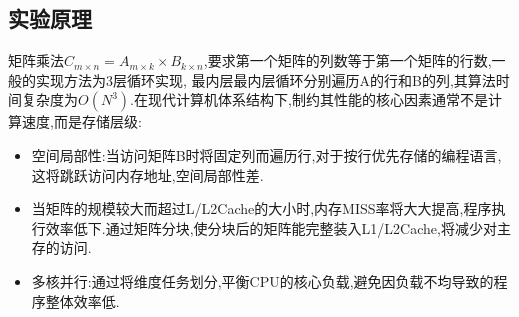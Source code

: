 \subsection{实验原理}
矩阵乘法$C_{m\times n} = A_{m \times k}\times B_{k \times n}$,要求第一个矩阵的列数等于第一个矩阵的行数,一般的实现方法为3层循环实现,
最内层最内层循环分别遍历A的行和B的列,其算法时间复杂度为$O(N^3)$.在现代计算机体系结构下,制约其性能的核心因素通常不是计算速度,而是存储层级:
\begin{itemize}
    \item 空间局部性:当访问矩阵B时将固定列而遍历行,对于按行优先存储的编程语言,这将跳跃访问内存地址,空间局部性差.
    \item 当矩阵的规模较大而超过L/L2Cache的大小时,内存MISS率将大大提高,程序执行效率低下.通过矩阵分块,使分块后的矩阵能完整装入L1/L2Cache,将减少对主存的访问.
    \item 多核并行:通过将维度任务划分,平衡CPU的核心负载,避免因负载不均导致的程序整体效率低.
\end{itemize}